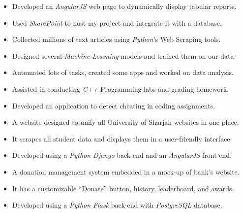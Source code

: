 \documentclass[10pt,a4paper]{altacv}
\begin{document}

\begin{itemize}
  \item Developed an \emph{AngularJS} web page to dynamically display tabular reports.  
  \item Used \emph{SharePoint} to host my project and integrate it with a database.
\end{itemize}

\divider

\begin{itemize}
  \item Collected millions of text articles using \emph{Python}'s Web Scraping tools.
  \item Designed several \emph{Machine Learning} models and trained them on our data.
  \item Automated lots of tasks, created some apps and worked on data analysis.
\end{itemize}

\divider

\begin{itemize}
  \item Assisted in conducting \emph{C++} Programming labs and grading homework.
  \item Developed an application to detect cheating in coding assignments.
\end{itemize}
\smallskip


\begin{itemize}
  \item A website designed to unify all University of Sharjah websites in one place.
  \item It scrapes all student data and displays them in a user-friendly interface.
  \item Developed using a \emph{Python Django} back-end and an \emph{AngularJS} front-end.
\end{itemize}

\divider

\begin{itemize}
  \item A donation management system embedded in a mock-up of bank's website.
  \item It has a customizable ``Donate'' button, history, leaderboard, and awards.
  \item Developed using a \emph{Python Flask} back-end with \emph{PostgreSQL} database.
\end{itemize}
\end{document}
